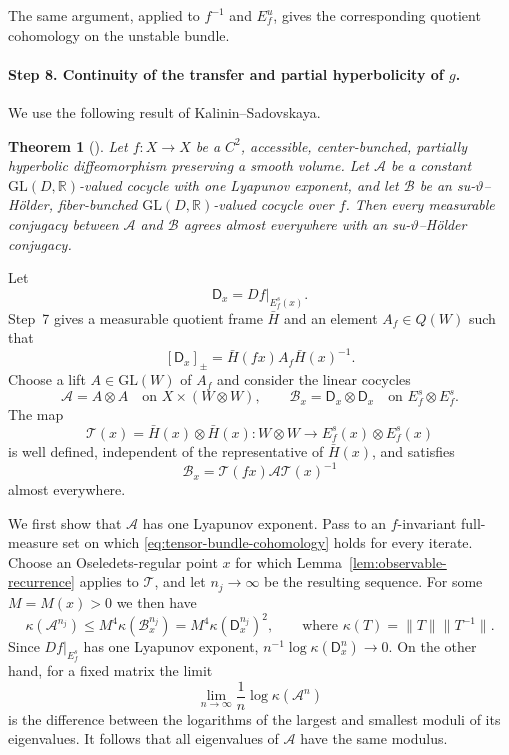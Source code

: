 \documentclass[11pt]{amsart}
\numberwithin{equation}{section}
\newcommand{\GL}{\mathrm{GL}}
\theoremstyle{plain}
\newtheorem{thm}{Theorem}[section]
\begin{document}
The same argument, applied to $f^{-1}$ and $E_f^u$, gives the
corresponding quotient cohomology on the unstable bundle.
\paragraph{\textbf{Step 8. Continuity of the transfer and partial
hyperbolicity of $g$.}}

We use the following result of Kalinin--Sadovskaya.

\begin{thm}[{\cite[Theorem~1.4]{KalSad23}}]\label{KS23}
Let $f:X\to X$ be a $C^2$, accessible, center-bunched, partially
hyperbolic diffeomorphism preserving a smooth volume.  Let $\mathcal A$
be a constant $\GL(D,\mathbb R)$-valued cocycle with one Lyapunov
exponent, and let $\mathcal B$ be an su-$\vartheta$--H\"older,
fiber-bunched $\GL(D,\mathbb R)$-valued cocycle over $f$.  Then every
measurable conjugacy between $\mathcal A$ and $\mathcal B$ agrees almost
everywhere with an su-$\vartheta$--H\"older conjugacy.
\end{thm}

Let
\[
\mathsf D_x=Df|_{E_f^s(x)}.
\]
Step~7 gives a measurable quotient frame $\bar H$ and an element
$A_f\in Q(W)$ such that
\[
[\mathsf D_x]_\pm=\bar H(fx)A_f\bar H(x)^{-1}.
\]
Choose a lift $A\in\GL(W)$ of $A_f$ and consider the linear cocycles
\[
\mathcal A=A\otimes A
\quad\text{on }X\times(W\otimes W),\qquad
\mathcal B_x=\mathsf D_x\otimes\mathsf D_x
\quad\text{on }E_f^s\otimes E_f^s.
\]
The map
\[
\mathcal T(x)=\bar H(x)\otimes\bar H(x):
W\otimes W\longrightarrow E_f^s(x)\otimes E_f^s(x)
\]
is well defined, independent of the representative of $\bar H(x)$,
and satisfies
\begin{equation}\label{eq:tensor-bundle-cohomology}
\mathcal B_x=\mathcal T(fx)\mathcal A\mathcal T(x)^{-1}
\end{equation}
almost everywhere.

We first show that $\mathcal A$ has one Lyapunov exponent. Pass to an
$f$-invariant full-measure set on which
\eqref{eq:tensor-bundle-cohomology} holds for every iterate. Choose an
Oseledets-regular point $x$ for which
Lemma~\ref{lem:observable-recurrence} applies to $\mathcal T$, and let
$n_j\to\infty$ be the resulting sequence.  For some $M=M(x)>0$ we then
have
\[
\kappa(\mathcal A^{n_j})
 \le M^4\kappa(\mathcal B_x^{n_j})
 =M^4\kappa(\mathsf D_x^{n_j})^2,
\qquad \text{where }
\kappa(T)=\|T\|\|T^{-1}\|.
\]
Since $Df|_{E_f^s}$ has one Lyapunov exponent,
$n^{-1}\log\kappa(\mathsf D_x^n)\to0$. On the other hand, for a fixed matrix
the limit
\[
\lim_{n\to\infty}\frac1n\log\kappa(\mathcal A^n)
\]
is the difference between the logarithms of the largest and smallest
moduli of its eigenvalues. It follows that all eigenvalues of
$\mathcal A$ have the same modulus.
\end{document}
